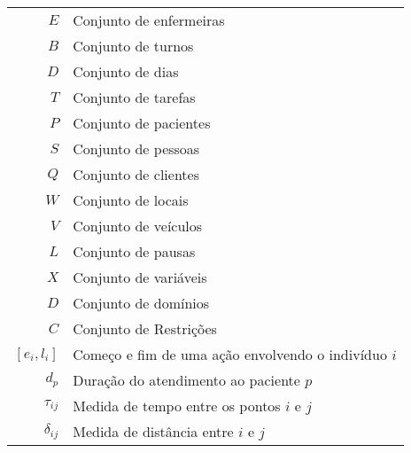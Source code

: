 
\begin{tabular}{rl}
$E$ & Conjunto de enfermeiras \\
$B$ & Conjunto de turnos \\
$D$ & Conjunto de dias \\
$T$ & Conjunto de tarefas \\
$P$ & Conjunto de pacientes \\
$S$ & Conjunto de pessoas \\
$Q$ & Conjunto de clientes \\
$W$ & Conjunto de locais \\
$V$ & Conjunto de veículos \\
$L$ & Conjunto de pausas \\
$X$ & Conjunto de variáveis \\
$D$ & Conjunto de domínios \\
$C$ & Conjunto de Restrições \\
$[e_i,l_i]$ & Começo e fim de uma aç\~ ao envolvendo o indiv\'iduo $i$ \\
$d_p$ & Duraç\~ao do atendimento ao paciente $p$ \\
$\tau_{ij}$ & Medida de tempo entre os pontos $i$ e $j$ \\
$\delta_{ij}$ & Medida de distância entre $i$ e $j$
\end{tabular}